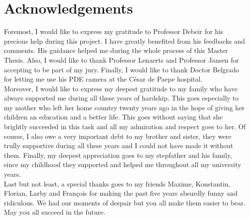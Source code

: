 \chapter*{Acknowledgements}
\thispagestyle{empty}


Foremost, I would like to express my gratitude to Professor Debeir for his precious help during this project. I have greatly benefited from his feedbacks and comments. His guidance helped me during the whole process of this Master Thesis. Also, I would like to thank Professor Lenaerts and Professor Jansen for accepting to be part of my jury. Finally, I would like to thank Doctor Belgrado for letting me use his PDE camera at the César de Paepe hospital.\\

Moreover, I would like to express my deepest gratitude to my family who have always supported me during all these years of hardship. This goes especially to my mother who left her home country twenty years ago in the hope of giving her children an education and a better life. This goes without saying that she brightly succeeded in this task and all my admiration and respect goes to her. Of course, I also owe a very important debt to my brother and sister, they were trully supportive during all these years and I could not have made it without them. Finally, my deepest appreciation goes to my stepfather and his family, since my childhood they supported and helped me throughout all my university years.\\

Last but not least, a special thanks goes to my friends Maxime, Konstantin, Florian, Larby and François for making the past five years absurdly funny and ridiculous. We had our moments of despair but you all make them easier to bear. May you all succeed in the future.

\clearpage